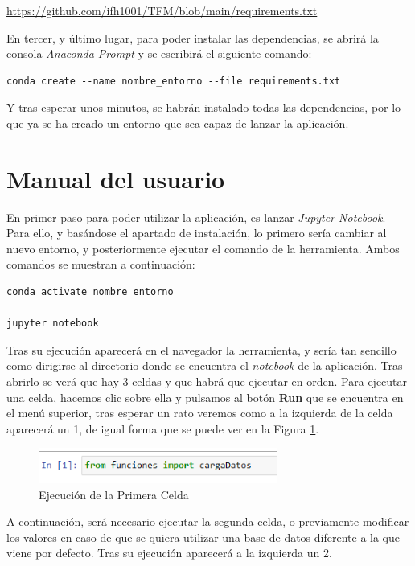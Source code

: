 \url{https://github.com/ifh1001/TFM/blob/main/requirements.txt}

En tercer, y último lugar, para poder instalar las dependencias, se abrirá la consola \emph{Anaconda Prompt} y se escribirá el siguiente comando:

\begin{verbatim}
conda create --name nombre_entorno --file requirements.txt
\end{verbatim}

Y tras esperar unos minutos, se habrán instalado todas las dependencias, por lo que ya se ha creado un entorno que sea capaz de lanzar la aplicación.

\section{Manual del usuario}
En primer paso para poder utilizar la aplicación, es lanzar \emph{Jupyter Notebook}. Para ello, y basándose el apartado de instalación, lo primero sería cambiar al nuevo entorno, y posteriormente ejecutar el comando de la herramienta. Ambos comandos se muestran a continuación:

\begin{verbatim}
conda activate nombre_entorno

jupyter notebook
\end{verbatim}

Tras su ejecución aparecerá en el navegador la herramienta, y sería tan sencillo como dirigirse al directorio donde se encuentra el \emph{notebook} de la aplicación. Tras abrirlo se verá que hay 3 celdas y que habrá que ejecutar en orden. Para ejecutar una celda, hacemos clic sobre ella y pulsamos al botón \textbf{Run} que se encuentra en el menú superior, tras esperar un rato veremos como a la izquierda de la celda aparecerá un 1, de igual forma que se puede ver en la Figura \ref{f:celda1}.

\begin{figure}[h]
 \centering
  \includegraphics[width=0.7\textwidth]{img/celda1.PNG}
 \caption{Ejecución de la Primera Celda}
 \label{f:celda1}
\end{figure}

A continuación, será necesario ejecutar la segunda celda, o previamente modificar los valores en caso de que se quiera utilizar una base de datos diferente a la que viene por defecto. Tras su ejecución aparecerá a la izquierda un 2.

